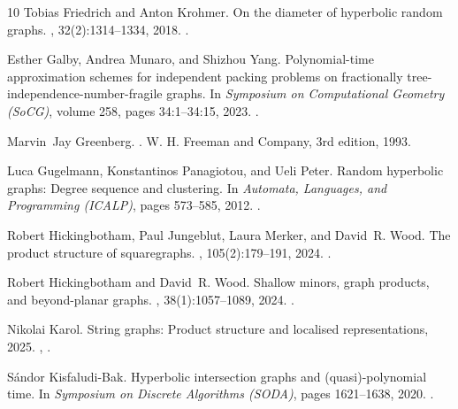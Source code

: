 \documentclass[11pt]{article}
\begin{document}
\begin{thebibliography}{10}
Tobias Friedrich and Anton Krohmer.
\newblock On the diameter of hyperbolic random graphs.
, 32(2):1314--1334, 2018.
\newblock \href {https://doi.org/10.1137/17M1123961} {}.

Esther Galby, Andrea Munaro, and Shizhou Yang.
\newblock Polynomial-time approximation schemes for independent packing problems on fractionally tree-independence-number-fragile graphs.
\newblock In {\em Symposium on Computational Geometry (SoCG)}, volume 258, pages 34:1--34:15, 2023.
\newblock \href {https://doi.org/10.4230/LIPIcs.SoCG.2023.34} {}.

Marvin~Jay Greenberg.
.
\newblock W. H. Freeman and Company, 3rd edition, 1993.

Luca Gugelmann, Konstantinos Panagiotou, and Ueli Peter.
\newblock Random hyperbolic graphs: Degree sequence and clustering.
\newblock In {\em Automata, Languages, and Programming (ICALP)}, pages 573--585, 2012.
\newblock \href {https://doi.org/10.1007/978-3-642-31585-5_51} {}.

Robert Hickingbotham, Paul Jungeblut, Laura Merker, and David~R. Wood.
\newblock The product structure of squaregraphs.
, 105(2):179--191, 2024.
\newblock \href {https://doi.org/10.1002/jgt.23008} {}.

Robert Hickingbotham and David~R. Wood.
\newblock Shallow minors, graph products, and beyond-planar graphs.
, 38(1):1057--1089, 2024.
\newblock \href {https://doi.org/10.1137/22M1540296} {}.

Nikolai Karol.
\newblock String graphs: Product structure and localised representations, 2025.
\newblock \href {https://arxiv.org/abs/2511.15156} {}, \href {https://doi.org/10.48550/arXiv.2511.15156} {}.

Sándor Kisfaludi-Bak.
\newblock Hyperbolic intersection graphs and (quasi)-polynomial time.
\newblock In {\em Symposium on Discrete Algorithms (SODA)}, pages 1621--1638, 2020.
\newblock \href {https://doi.org/10.1137/1.9781611975994.100} {}.


\end{thebibliography}
\end{document}
